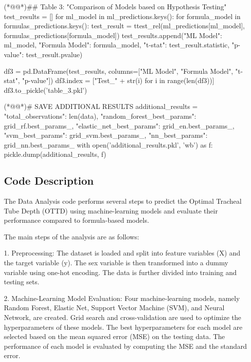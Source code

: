 \documentclass[11pt]{article}
\begin{document}
\begin{python}
(*@@*)## Table 3: "Comparison of Models based on Hypothesis Testing"
test_results = []
for ml_model in ml_predictions.keys():
    for formula_model in formulas_predictions.keys():
        test_result = ttest_rel(ml_predictions[ml_model], formulas_predictions[formula_model])
        test_results.append({"ML Model": ml_model, "Formula Model": formula_model, 
                             "t-stat": test_result.statistic, "p-value": test_result.pvalue})

df3 = pd.DataFrame(test_results, columns=["ML Model", "Formula Model", "t-stat", "p-value"])
df3.index = ["Test_" + str(i) for i in range(len(df3))]
df3.to_pickle('table_3.pkl')

(*@@*)# SAVE ADDITIONAL RESULTS 
additional_results = {
    "total_observations": len(data),
    "random_forest_best_params": grid_rf.best_params_,
    "elastic_net_best_params": grid_en.best_params_,
    "svm_best_params": grid_svm.best_params_,
    "nn_best_params": grid_nn.best_params_
}
with open('additional_results.pkl', 'wb') as f:
    pickle.dump(additional_results, f)

\end{python}

\subsection{Code Description}

The Data Analysis code performs several steps to predict the Optimal Tracheal Tube Depth (OTTD) using machine-learning models and evaluate their performance compared to formula-based models.

The main steps of the analysis are as follows:

1. Preprocessing: The dataset is loaded and split into feature variables (X) and the target variable (y). The sex variable is then transformed into a dummy variable using one-hot encoding. The data is further divided into training and testing sets.

2. Machine-Learning Model Evaluation: Four machine-learning models, namely Random Forest, Elastic Net, Support Vector Machine (SVM), and Neural Network, are created. Grid search and cross-validation are used to optimize the hyperparameters of these models. The best hyperparameters for each model are selected based on the mean squared error (MSE) on the testing data. The performance of each model is evaluated by computing the MSE and the standard error.
\end{document}
